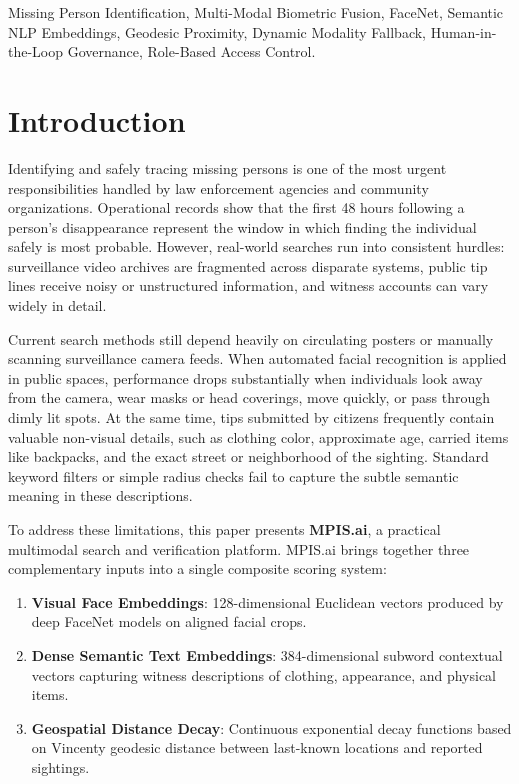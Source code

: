 \documentclass[conference]{IEEEtran}
\begin{document}
\begin{IEEEkeywords}
Missing Person Identification, Multi-Modal Biometric Fusion, FaceNet, Semantic NLP Embeddings, Geodesic Proximity, Dynamic Modality Fallback, Human-in-the-Loop Governance, Role-Based Access Control.
\end{IEEEkeywords}

\section{Introduction}
Identifying and safely tracing missing persons is one of the most urgent responsibilities handled by law enforcement agencies and community organizations. Operational records show that the first 48 hours following a person's disappearance represent the window in which finding the individual safely is most probable. However, real-world searches run into consistent hurdles: surveillance video archives are fragmented across disparate systems, public tip lines receive noisy or unstructured information, and witness accounts can vary widely in detail.

Current search methods still depend heavily on circulating posters or manually scanning surveillance camera feeds. When automated facial recognition is applied in public spaces, performance drops substantially when individuals look away from the camera, wear masks or head coverings, move quickly, or pass through dimly lit spots. At the same time, tips submitted by citizens frequently contain valuable non-visual details, such as clothing color, approximate age, carried items like backpacks, and the exact street or neighborhood of the sighting. Standard keyword filters or simple radius checks fail to capture the subtle semantic meaning in these descriptions.

To address these limitations, this paper presents \textbf{MPIS.ai}, a practical multimodal search and verification platform. MPIS.ai brings together three complementary inputs into a single composite scoring system:
\begin{enumerate}
    \item \textbf{Visual Face Embeddings}: 128-dimensional Euclidean vectors produced by deep FaceNet models on aligned facial crops.
    \item \textbf{Dense Semantic Text Embeddings}: 384-dimensional subword contextual vectors capturing witness descriptions of clothing, appearance, and physical items.
    \item \textbf{Geospatial Distance Decay}: Continuous exponential decay functions based on Vincenty geodesic distance between last-known locations and reported sightings.
\end{enumerate}
\end{document}
